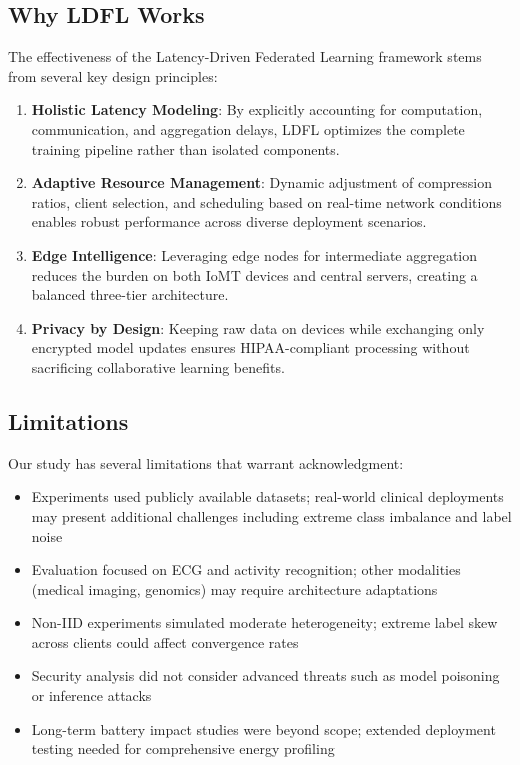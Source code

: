 \documentclass[10pt,conference]{IEEEtran}
\begin{document}
\subsection{Why LDFL Works}
The effectiveness of the Latency-Driven Federated Learning framework stems from several key design principles:
\begin{enumerate}
    \item \textbf{Holistic Latency Modeling}: By explicitly accounting for computation, communication, and aggregation delays, LDFL optimizes the complete training pipeline rather than isolated components.
    \item \textbf{Adaptive Resource Management}: Dynamic adjustment of compression ratios, client selection, and scheduling based on real-time network conditions enables robust performance across diverse deployment scenarios.
    \item \textbf{Edge Intelligence}: Leveraging edge nodes for intermediate aggregation reduces the burden on both IoMT devices and central servers, creating a balanced three-tier architecture.
    \item \textbf{Privacy by Design}: Keeping raw data on devices while exchanging only encrypted model updates ensures HIPAA-compliant processing without sacrificing collaborative learning benefits.
\end{enumerate}

\subsection{Limitations}
Our study has several limitations that warrant acknowledgment:
\begin{itemize}
    \item Experiments used publicly available datasets; real-world clinical deployments may present additional challenges including extreme class imbalance and label noise
    \item Evaluation focused on ECG and activity recognition; other modalities (medical imaging, genomics) may require architecture adaptations
    \item Non-IID experiments simulated moderate heterogeneity; extreme label skew across clients could affect convergence rates
    \item Security analysis did not consider advanced threats such as model poisoning or inference attacks
    \item Long-term battery impact studies were beyond scope; extended deployment testing needed for comprehensive energy profiling
\end{itemize}
\end{document}
